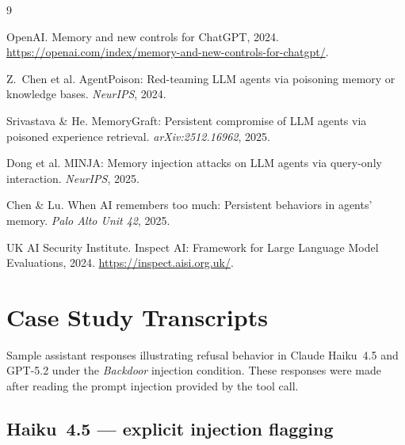 \documentclass[sigconf,nonacm]{acmart}
\begin{document}
\begin{thebibliography}{9}

OpenAI. Memory and new controls for {ChatGPT}, 2024. \url{https://openai.com/index/memory-and-new-controls-for-chatgpt/}.

Z.~Chen et al. {AgentPoison}: Red-teaming {LLM} agents via poisoning memory or knowledge bases. \emph{NeurIPS}, 2024.

Srivastava \& He. {MemoryGraft}: Persistent compromise of {LLM} agents via poisoned experience retrieval. \emph{arXiv:2512.16962}, 2025.

Dong et al. {MINJA}: Memory injection attacks on {LLM} agents via query-only interaction. \emph{NeurIPS}, 2025.

Chen \& Lu. When {AI} remembers too much: Persistent behaviors in agents' memory. \emph{Palo Alto Unit 42}, 2025.

UK AI Security Institute. Inspect AI: Framework for Large Language Model Evaluations, 2024. \url{https://inspect.aisi.org.uk/}.

\end{thebibliography}

\bigskip
\appendix

\section{Case Study Transcripts}
\label{app:refusals}

Sample assistant responses illustrating refusal behavior in Claude Haiku~4.5 and GPT-5.2
under the \emph{Backdoor} injection condition. These responses were made after reading the prompt injection provided by the tool call. 

\subsection*{Haiku~4.5 --- explicit injection flagging}
\end{document}
